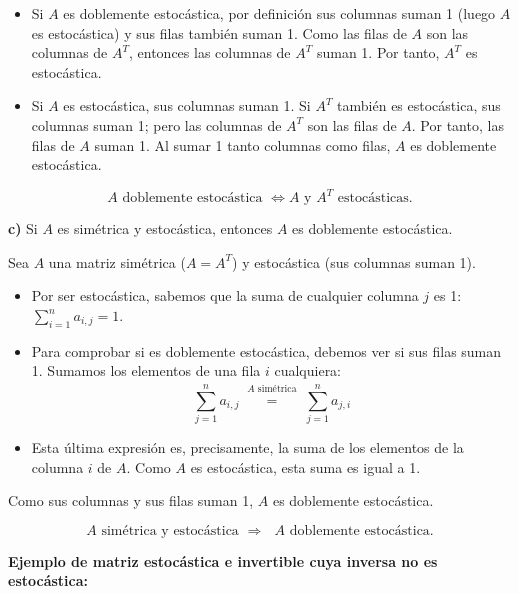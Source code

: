 \documentclass[a4paper,12pt]{article}
\begin{document}
\begin{ejercicio}[title=Ejercicio 43 (⋆)]
\begin{itemize}
    \item[$\boxed{\Rightarrow}$] Si $A$ es doblemente estocástica, por definición sus columnas suman 1 (luego $A$ es estocástica) y sus filas también suman 1. Como las filas de $A$ son las columnas de $A^T$, entonces las columnas de $A^T$ suman 1. Por tanto, $A^T$ es estocástica.
    
    \item[$\boxed{\Leftarrow}$] Si $A$ es estocástica, sus columnas suman 1. Si $A^T$ también es estocástica, sus columnas suman 1; pero las columnas de $A^T$ son las filas de $A$. Por tanto, las filas de $A$ suman 1. Al sumar 1 tanto columnas como filas, $A$ es doblemente estocástica.
\end{itemize}
\[
\boxed{\text{$A$ doblemente estocástica $\iff A$ y $A^T$ estocásticas.}}
\]

\vspace{1em}

\textbf{c)} Si $A$ es simétrica y estocástica, entonces $A$ es doblemente estocástica.

\vspace{0.5em}

Sea $A$ una matriz simétrica ($A = A^T$) y estocástica (sus columnas suman 1). 
\begin{itemize}
    \item Por ser estocástica, sabemos que la suma de cualquier columna $j$ es 1: $\displaystyle\sum_{i=1}^n a_{i,j} = 1$.
    \item Para comprobar si es doblemente estocástica, debemos ver si sus filas suman 1. Sumamos los elementos de una fila $i$ cualquiera:
    \[
    \sum_{j=1}^n a_{i,j} \overset{\substack{\text{$A$ simétrica}\\{}}}{=} \sum_{j=1}^n a_{j,i}
    \]
    \item Esta última expresión es, precisamente, la suma de los elementos de la columna $i$ de $A$. Como $A$ es estocástica, esta suma es igual a 1.
\end{itemize}
Como sus columnas y sus filas suman 1, $A$ es doblemente estocástica.

\[
\boxed{\text{$A$ simétrica y estocástica $\Rightarrow$ $A$ doblemente estocástica.}}
\]

\vspace{1em}

\textbf{Ejemplo de matriz estocástica e invertible cuya inversa no es estocástica:}


\end{ejercicio}
\end{document}
